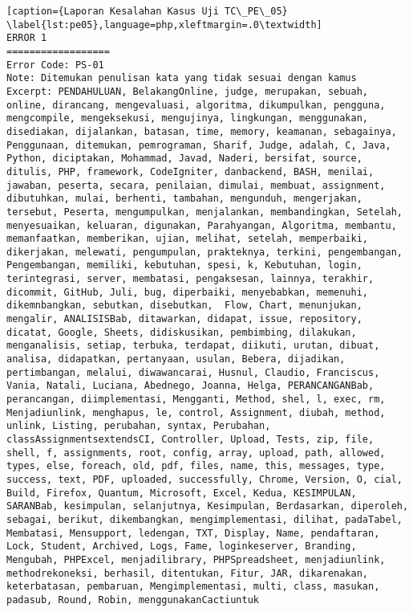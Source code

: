 \begin{enumerate}
\begin{lstlisting}[caption={Laporan Kesalahan Kasus Uji TC\_PE\_05}	\label{lst:pe05},language=php,xleftmargin=.0\textwidth]
ERROR 1
==================
Error Code: PS-01
Note: Ditemukan penulisan kata yang tidak sesuai dengan kamus
Excerpt: PENDAHULUAN, BelakangOnline, judge, merupakan, sebuah, online, dirancang, mengevaluasi, algoritma, dikumpulkan, pengguna, mengcompile, mengeksekusi, mengujinya, lingkungan, menggunakan, disediakan, dijalankan, batasan, time, memory, keamanan, sebagainya, Penggunaan, ditemukan, pemrograman, Sharif, Judge, adalah, C, Java, Python, diciptakan, Mohammad, Javad, Naderi, bersifat, source, ditulis, PHP, framework, CodeIgniter, danbackend, BASH, menilai, jawaban, peserta, secara, penilaian, dimulai, membuat, assignment, dibutuhkan, mulai, berhenti, tambahan, mengunduh, mengerjakan, tersebut, Peserta, mengumpulkan, menjalankan, membandingkan, Setelah, menyesuaikan, keluaran, digunakan, Parahyangan, Algoritma, membantu, memanfaatkan, memberikan, ujian, melihat, setelah, memperbaiki, dikerjakan, melewati, pengumpulan, prakteknya, terkini, pengembangan, Pengembangan, memiliki, kebutuhan, spesi, k, Kebutuhan, login, terintegrasi, server, membatasi, pengaksesan, lainnya, terakhir, dicommit, GitHub, Juli, bug, diperbaiki, menyebabkan, memenuhi, dikemnbangkan, sebutkan, disebutkan,  Flow, Chart, menunjukan, mengalir, ANALISISBab, ditawarkan, didapat, issue, repository, dicatat, Google, Sheets, didiskusikan, pembimbing, dilakukan, menganalisis, setiap, terbuka, terdapat, diikuti, urutan, dibuat, analisa, didapatkan, pertanyaan, usulan, Bebera, dijadikan, pertimbangan, melalui, diwawancarai, Husnul, Claudio, Franciscus, Vania, Natali, Luciana, Abednego, Joanna, Helga, PERANCANGANBab, perancangan, diimplementasi, Mengganti, Method, shel, l, exec, rm, Menjadiunlink, menghapus, le, control, Assignment, diubah, method, unlink, Listing, perubahan, syntax, Perubahan, classAssignmentsextendsCI, Controller, Upload, Tests, zip, file, shell, f, assignments, root, config, array, upload, path, allowed, types, else, foreach, old, pdf, files, name, this, messages, type, success, text, PDF, uploaded, successfully, Chrome, Version, O, cial, Build, Firefox, Quantum, Microsoft, Excel, Kedua, KESIMPULAN, SARANBab, kesimpulan, selanjutnya, Kesimpulan, Berdasarkan, diperoleh, sebagai, berikut, dikembangkan, mengimplementasi, dilihat, padaTabel, Membatasi, Mensupport, ledengan, TXT, Display, Name, pendaftaran, Lock, Student, Archived, Logs, Fame, loginkeserver, Branding, Mengubah, PHPExcel, menjadilibrary, PHPSpreadsheet, menjadiunlink, methodrekoneksi, berhasil, ditentukan, Fitur, JAR, dikarenakan, keterbatasan, pembaruan, Mengimplementasi, multi, class, masukan, padasub, Round, Robin, menggunakanCactiuntuk


\end{lstlisting}
\end{enumerate}
